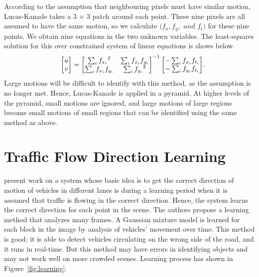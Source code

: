 According to the assumption that neighbouring pixels must have similar motion, Lucas-Kanade takes a 3 $ \times $ 3 patch around each point. These nine pixels are all assumed to have the same motion, so we calculate  $ (f_x,f_y,$ $ and $ $ f_t) $ for these nine points. We obtain nine equations in the two unknown variables. The least-squares solution for this over constrained system of linear equations is shows below.
\[
\begin{array}{lc}
  {\rm } & {  \begin{bmatrix} u \\ v \end{bmatrix} = \begin{bmatrix} \sum_{i}{f_{x_i}}^2 & \sum_{i}{f_{x_i} f_{y_i} } \\ \sum_{i}{f_{x_i} f_{y_i}} & \sum_{i}{f_{y_i}}^2 \end{bmatrix}^{-1} \begin{bmatrix} - \sum_{i}{f_{x_i} f_{t_i}} \\ - \sum_{i}{f_{y_i} f_{t_i}} \end{bmatrix}  }.\\ 
\end{array}
\]
Large motions will be difficult to identify with this method, as the assumption is no longer met. Hence, Lucas-Kanade is applied in a pyramid. At higher levels of the pyramid, small motions are ignored, and large motions of large regions become small motions of small regions that can be identified using the same method as above.

\section{Traffic Flow Direction Learning}
 present work on a system whose basic idea is to get the correct direction of motion of vehicles in different lanes is during a learning period when it is assumed that traffic is flowing in the correct direction. Hence, the system learns the correct direction for each point in the scene. The authors propose a learning method that analyzes many frames. A Gaussian mixture model is learned for each block in the image by analysis of vehicles' movement over time. This method is good; it is able to detect vehicles circulating on the wrong side of the road, and it runs in real-time. But this method may have errors in identifying objects and may not work well on more crowded scenes. Learning process has shown in Figure~\ref{fig:learning}.
 

